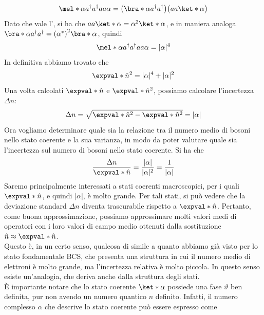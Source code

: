 \begin{equation*}
   \mel*{\alpha}{a^{\dag}a^{\dag} a a }{\alpha}
   =\bigl( \bra*{\alpha} a^{\dag}a^{\dag} \bigr) \bigl( a a \ket*{\alpha} \bigr)
\end{equation*}
Dato che vale l', si ha che $a a \ket*{\alpha} = \alpha^2 \ket*{\alpha}$, e in maniera analoga $\bra*{\alpha} a^{\dag}a^{\dag} = {(\alpha^*)}^2 \bra*{\alpha}$, quindi
\begin{equation*}
   \mel*{\alpha}{a^{\dag}a^{\dag} a a }{\alpha}
   =|\alpha|^4
\end{equation*}
In definitiva abbiamo trovato che
\begin{equation*}
   \expval*{\hat{n}^2} = |\alpha|^4 + |\alpha|^2
\end{equation*}
Una volta calcolati $\expval*{\hat{n}}$ e $\expval*{\hat{n}^2}$, possiamo calcolare l'incertezza $\Delta n$:
\begin{equation*}
   \Delta n
   = \sqrt{\expval*{\hat{n}^2} - \expval*{\hat{n}}^2}
   = |\alpha|
\end{equation*}
Ora vogliamo determinare quale sia la relazione tra il numero medio di bosoni nello stato coerente e la sua varianza, in modo da poter valutare quale sia l'incertezza sul numero di bosoni nello stato coerente. Si ha che
\begin{equation}
   \frac{\Delta n}{\expval*{\hat{n}}}
   =\frac{|\alpha|}{|\alpha|^2}
   =\frac{1}{|\alpha|}
\end{equation}
Saremo principalmente interessati a stati coerenti macroscopici, per i quali $\expval*{\hat{n}}$, e quindi $|\alpha|$, è molto grande. Per tali stati, si può vedere che la deviazione standard $\Delta n$ diventa trascurabile rispetto a $\expval*{\hat{n}}$. Pertanto, come buona approssimazione, possiamo approssimare molti valori medi di operatori con i loro valori di campo medio ottenuti dalla sostituzione $\hat{n} \approx \expval*{\hat{n}}$.\\
Questo è, in un certo senso, qualcosa di simile a quanto abbiamo già visto per lo stato fondamentale BCS, che presenta una struttura in cui il numero medio di elettroni è molto grande, ma l'incertezza relativa è molto piccola. In questo senso esiste un'analogia, che deriva anche dalla struttura degli stati.\\
È importante notare che lo stato coerente $\ket*{\alpha}$ possiede una fase $\vartheta$ ben definita, pur non avendo un numero quantico $n$ definito. Infatti, il numero complesso $\alpha$ che descrive lo stato coerente può essere espresso come
